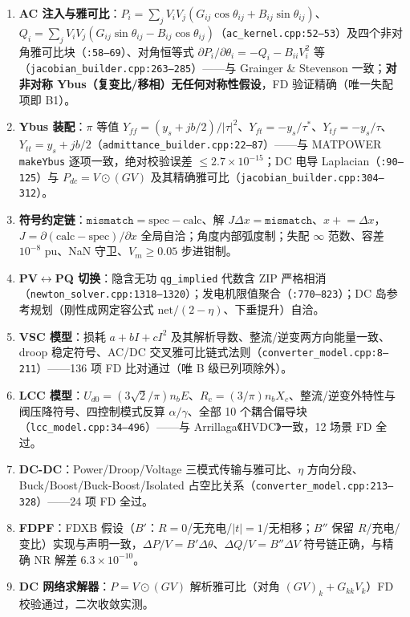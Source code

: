 \documentclass[11pt,a4paper,fontset=fandol]{ctexart}
\newcommand{\file}[1]{\texttt{#1}}
\begin{document}
\begin{enumerate}
  \item \textbf{AC 注入与雅可比}：$P_i=\sum_j V_iV_j(G_{ij}\cos\theta_{ij}+B_{ij}\sin\theta_{ij})$、$Q_i=\sum_j V_iV_j(G_{ij}\sin\theta_{ij}-B_{ij}\cos\theta_{ij})$（\file{ac\_kernel.cpp:52--53}）及四个非对角雅可比块（\file{:58--69}）、对角恒等式 $\partial P_i/\partial\theta_i=-Q_i-B_{ii}V_i^2$ 等（\file{jacobian\_builder.cpp:263--285}）——与 Grainger \& Stevenson 一致；\textbf{对非对称 Ybus（复变比/移相）无任何对称性假设}，FD 验证精确（唯一失配项即 B1）。
  \item \textbf{Ybus 装配}：$\pi$ 等值 $Y_{ff}=(y_s+jb/2)/|\tau|^2$、$Y_{ft}=-y_s/\tau^{*}$、$Y_{tf}=-y_s/\tau$、$Y_{tt}=y_s+jb/2$（\file{admittance\_builder.cpp:22--87}）——与 MATPOWER \texttt{makeYbus} 逐项一致，绝对校验误差 $\le 2.7\times10^{-15}$；DC 电导 Laplacian（\file{:90--125}）与 $P_{dc}=V\odot(GV)$ 及其精确雅可比（\file{jacobian\_builder.cpp:304--312}）。
  \item \textbf{符号约定链}：$\texttt{mismatch}=\mathrm{spec}-\mathrm{calc}$、解 $J\Delta x=\texttt{mismatch}$、$x\mathrel{+}=\Delta x$，$J=\partial(\mathrm{calc}-\mathrm{spec})/\partial x$ 全局自洽；角度内部弧度制；失配 $\infty$ 范数、容差 $10^{-8}$ pu、NaN 守卫、$V_m\ge 0.05$ 步进钳制。
  \item \textbf{PV$\leftrightarrow$PQ 切换}：隐含无功 \texttt{qg\_implied} 代数含 ZIP 严格相消（\file{newton\_solver.cpp:1318--1320}）；发电机限值聚合（\file{:770--823}）；DC 岛参考规划（刚性成网定容公式 $\mathrm{net}/(2-\eta)$、下垂提升）自洽。
  \item \textbf{VSC 模型}：损耗 $a+bI+cI^2$ 及其解析导数、整流/逆变两方向能量一致、droop 稳定符号、AC/DC 交叉雅可比链式法则（\file{converter\_model.cpp:8--211}）——136 项 FD 比对通过（唯 B 级已列项除外）。
  \item \textbf{LCC 模型}：$U_{d0}=(3\sqrt{2}/\pi)n_bE$、$R_c=(3/\pi)n_bX_c$、整流/逆变外特性与阀压降符号、四控制模式反算 $\alpha/\gamma$、全部 10 个耦合偏导块（\file{lcc\_model.cpp:34--496}）——与 Arrillaga《HVDC》一致，12 场景 FD 全过。
  \item \textbf{DC-DC}：Power/Droop/Voltage 三模式传输与雅可比、$\eta$ 方向分段、Buck/Boost/Buck-Boost/Isolated 占空比关系（\file{converter\_model.cpp:213--328}）——24 项 FD 全过。
  \item \textbf{FDPF}：FDXB 假设（$B'$：$R=0$/无充电/$|t|=1$/无相移；$B''$ 保留 $R$/充电/变比）实现与声明一致，$\Delta P/V=B'\Delta\theta$、$\Delta Q/V=B''\Delta V$ 符号链正确，与精确 NR 解差 $6.3\times10^{-10}$。
  \item \textbf{DC 网络求解器}：$P=V\odot(GV)$ 解析雅可比（对角 $(GV)_k+G_{kk}V_k$）FD 校验通过，二次收敛实测。

\end{enumerate}
\end{document}
